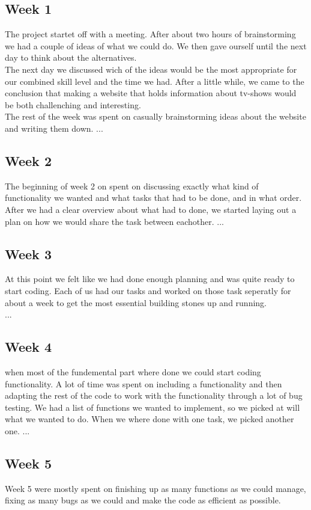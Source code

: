 \subsection{Week 1}
The project startet off with a meeting. After about two hours of brainstorming we had a couple of ideas of what we could do. We then gave ourself until the next day to think about the alternatives. \\
The next day we discussed wich of the ideas would be the most appropriate for our combined skill level and the time we had. After a little while, we came to the conclusion that making a website that holds information about tv-shows would be both challenching and interesting.\\

The rest of the week was spent on casually brainstorming ideas about the website and writing them down.
...
\subsection{Week 2}

The beginning of week 2 on spent on discussing exactly what kind of functionality we wanted and what tasks that had to be done, and in what order.
After we had a clear overview about what had to done, we started laying out a plan on how we would share the task between eachother.
...
\subsection{Week 3}
At this point we felt like we had done enough planning and was quite ready to start coding. Each of us had our tasks and worked on those task seperatly for about a week to get the most essential building stones up and running.\\
...
\subsection{Week 4}
when most of the fundemental part where done we could start coding functionality. A lot of time was spent on including a functionality and then adapting the rest of the code to work with the functionality through a lot of bug testing. We had a list of functions we wanted to implement, so we picked at will what we wanted to do. When we where done with one task, we picked another one.
...
\subsection{Week 5}
Week 5 were mostly spent on finishing up as many functions as we could manage, fixing as many bugs as we could and make the code as efficient as possible.\\

